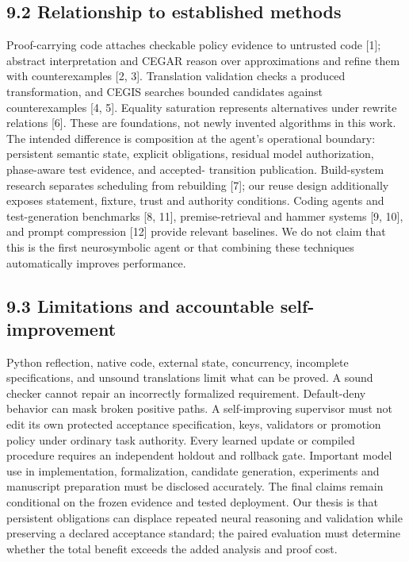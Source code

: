 \subsection*{9.2 Relationship to established methods}

Proof-carrying code attaches checkable policy evidence to untrusted code [1]; abstract interpretation
and CEGAR reason over approximations and refine them with counterexamples [2, 3]. Translation
validation checks a produced transformation, and CEGIS searches bounded candidates against
counterexamples [4, 5]. Equality saturation represents alternatives under rewrite relations [6]. These
are foundations, not newly invented algorithms in this work.
The intended difference is composition at the agent’s operational boundary: persistent semantic
state, explicit obligations, residual model authorization, phase-aware test evidence, and accepted-
transition publication. Build-system research separates scheduling from rebuilding [7]; our reuse
design additionally exposes statement, fixture, trust and authority conditions. Coding agents and
test-generation benchmarks [8, 11], premise-retrieval and hammer systems [9, 10], and prompt
compression [12] provide relevant baselines. We do not claim that this is the first neurosymbolic
agent or that combining these techniques automatically improves performance.

\subsection*{9.3 Limitations and accountable self-improvement}

Python reflection, native code, external state, concurrency, incomplete specifications, and unsound
translations limit what can be proved. A sound checker cannot repair an incorrectly formalized
requirement. Default-deny behavior can mask broken positive paths. A self-improving supervisor
must not edit its own protected acceptance specification, keys, validators or promotion policy under
ordinary task authority. Every learned update or compiled procedure requires an independent holdout
and rollback gate.
Important model use in implementation, formalization, candidate generation, experiments and
manuscript preparation must be disclosed accurately. The final claims remain conditional on the
frozen evidence and tested deployment. Our thesis is that persistent obligations can displace repeated
neural reasoning and validation while preserving a declared acceptance standard; the paired evaluation
must determine whether the total benefit exceeds the added analysis and proof cost.




